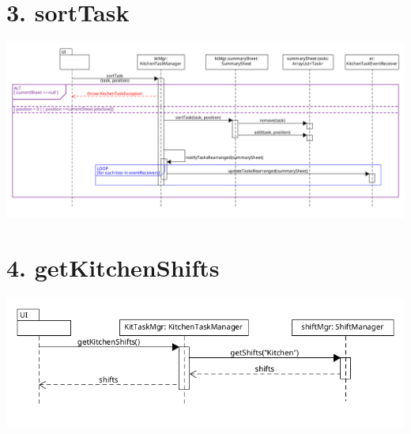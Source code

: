 \pagebreak

\section*{3. sortTask}

\begin{center}
  \includegraphics[scale = 0.35]{images/DSD/DSD 3.png}
\end{center}

\pagebreak

\section*{4. getKitchenShifts}

\begin{center}
  \includegraphics[scale = 0.5]{images/DSD/DSD 4.png}
\end{center}

\pagebreak